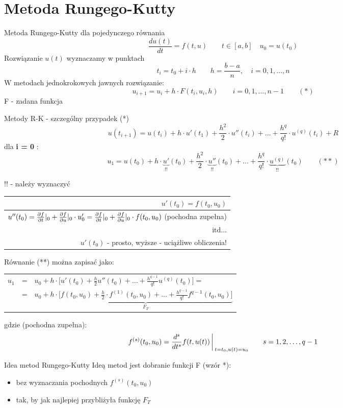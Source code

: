 \section{Metoda Rungego-Kutty}
\begin{frame}{Metoda Rungego-Kutty dla pojedynczego równania}
	$$\frac{du(t)}{dt}=f(t,u)\qquad t \in [a,b] \quad u_0 = u(t_0)$$
    Rozwiązanie $u(t)$ wyznaczamy w punktach
    $$t_i = t_0+i\cdot h \qquad h=\frac{b-a}{n}, \quad i = 0,1,\ldots,n$$
    W metodach jednokrokowych jawnych rozwiązanie:
    $$u_{i+1} = u_i + h\cdot F(t_i,u_i,h) \qquad i = 0,1,\ldots,n-1 \qquad(*)$$
    F - zadana funkcja
\end{frame}
\begin{frame}{Metody R-K - szczególny przypadek (*)}
	$$u(t_{i+1}) = u(t_i)+h\cdot u'(t_1)+\frac{h^2}{2}\cdot u''(t_i)+\ldots+\frac{h^q}{q!}\cdot u^{(q)}(t_i) + R$$
    dla \textbf{i = 0} :
    $$u_1 = u(t_0) + h\cdot \underbrace{u'}_{!!}(t_0)+\frac{h^2}{2}\cdot\underbrace{u''}_{!!}(t_0)+\ldots+\frac{h^q}{q!}\cdot \underbrace{u^{(q)}}_{!!}(t_0) \qquad (**) $$
    \begin{flushright}
    	!! - należy wyznaczyć
    \end{flushright}
    \begin{center}
    	\begin{tabular}{|r|} \hline
    		$u'(t_0)=f(t_0,u_0)$\\ \hline
        	$u''(t_0) = \frac{\partial f}{\partial t}\arrowvert_0+\frac{\partial f}{\partial u}\arrowvert_0 \cdot u'_0 = \frac{\partial f}{\partial t}\arrowvert_0 + \frac{\partial f}{\partial u}\arrowvert_0 \cdot f(t_0,u_0)$ (pochodna zupełna)\\ \hline
        itd... \\ \hline
       		$u'(t_0)$ - prosto, wyższe - uciążliwe obliczenia!\\ \hline
    	\end{tabular}
    \end{center}
\end{frame}
\begin{frame}
	Równanie (**) można zapisać jako:
    \begin{tabular}{ccl}
    $u_1$ & = & $u_0+h \cdot \bigg[u'(t_0)+\frac{h}{2}u''(t_0) +\ldots+\frac{h^{q-1}}{q!}u^{(q)}(t_0)\bigg] =$\\
     & = & $u_0 + h \cdot \underbrace{\bigg[f(t_0,u_0)+\frac{h}{2}\cdot f^{(1)}(t_0,u_0)+\ldots+\frac{h^{q-1}}{q!}f^{q-1}(t_0,u_0)\bigg]}_{F_T}$
    \end{tabular}
    gdzie (pochodna zupełna):
    $$f^{(s)}(t_0,u_0) = \frac{d^s}{dt^s}f(t,u(t))\bigg\arrowvert_{t=t_0, u(t)=u_0} \qquad s = 1,2,\ldots,q-1$$
    \begin{block}{Idea metod Rungego-Kutty}
    Ideą metod jest dobranie funkcji F (wzór *):
    	\begin{itemize}
          \item bez wyznaczania pochodnych $f^{(s)}(t_0,u_0)$
          \item tak, by jak najlepiej przybliżyła funkcję $F_T$
    	\end{itemize}
    \end{block}
\end{frame}
